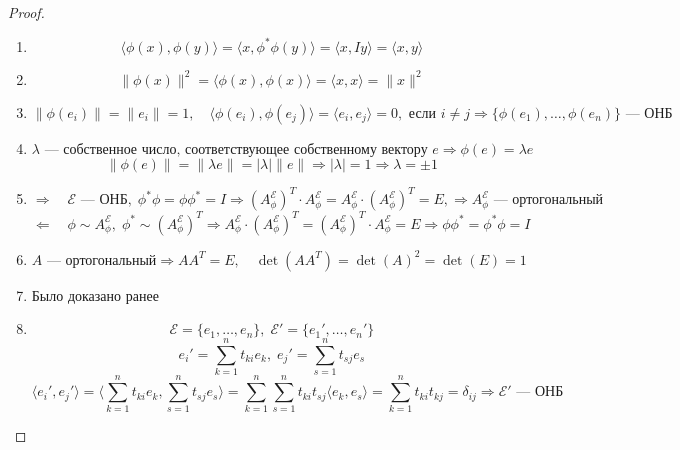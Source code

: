 \begin{proof}
    \leavevmode
    \begin{enumerate}
        \item 
            \[
            \langle \phi(x), \phi(y) \rangle = \langle x, \phi^* \phi(y) \rangle = \langle x, I y \rangle = \langle x, y \rangle
            \]
        \item
            \[
            \|\phi(x)\|^2 = \langle \phi(x), \phi(x) \rangle = \langle x, x \rangle = \|x\|^2
            \]
        \item 
            \[
            \|\phi(e_{i})\| = \|e_{i}\| = 1, \quad \langle \phi(e_{i}), \phi(e_{j}) \rangle = \langle e_{i}, e_{j} \rangle = 0, \text{ если } i \neq j \Rightarrow \{\phi(e_{1}), \ldots, \phi(e_{n})\} \text{ — ОНБ}
            \]
        \item 
        \[
        \lambda \text{ — собственное число, соответствующее собственному вектору } e \Rightarrow \phi(e) = \lambda e
        \]
        \[
        \|\phi(e)\| = \|\lambda e\| = |\lambda| \|e\| \Rightarrow |\lambda| = 1 \Rightarrow \lambda = \pm 1
        \]
        \item 
        \[
        \boxed{\Rightarrow} \quad \mathcal{E} \text{ — ОНБ}, \; \phi^* \phi = \phi \phi^* = I \Rightarrow (A_{\phi}^{\mathcal{E}})^T \cdot A_{\phi}^{\mathcal{E}} = A_{\phi}^{\mathcal{E}} \cdot (A_{\phi}^{\mathcal{E}})^T = E, \Rightarrow A_{\phi}^{\mathcal{E}} \text{ — ортогональный}
        \]
        \[
        \boxed{\Leftarrow} \quad \phi \sim A_{\phi}^{\mathcal{E}}, \; \phi^* \sim (A_{\phi}^{\mathcal{E}})^T \Rightarrow A_{\phi}^{\mathcal{E}} \cdot (A_{\phi}^{\mathcal{E}})^T = (A_{\phi}^{\mathcal{E}})^T \cdot A_{\phi}^{\mathcal{E}} = E \Rightarrow \phi \phi^* = \phi^* \phi = I
        \]
        \item 
        \[
        A \text{ — ортогональный} \Rightarrow A A^T = E, \quad \det(A A^T) = \det(A)^2 = \det(E) = 1
        \]
        \item Было доказано ранее
        \item 
        \[
        \mathcal{E} = \{e_{1}, \ldots, e_{n}\}, \; \mathcal{E}' = \{e_{1}',\ldots, e_{n}'\}
        \]
        \[
        e_{i}' = \sum\limits_{k=1}^{n} t_{ki} e_{k}, \; e_{j}' = \sum\limits_{s=1}^{n} t_{sj} e_{s}
        \]
        \[
        \langle e_{i}', e_{j}' \rangle = \langle \sum\limits_{k=1}^{n} t_{ki} e_{k}, \sum\limits_{s=1}^{n} t_{sj} e_{s} \rangle = \sum_{k=1}^{n} \sum\limits_{s=1}^{n} t_{ki} t_{sj} \langle e_{k}, e_{s} \rangle = \sum\limits_{k=1}^{n} t_{ki} t_{kj} = \delta_{ij} \Rightarrow \mathcal{E}' \text{ — ОНБ}
        \]
    \end{enumerate}
\end{proof}


